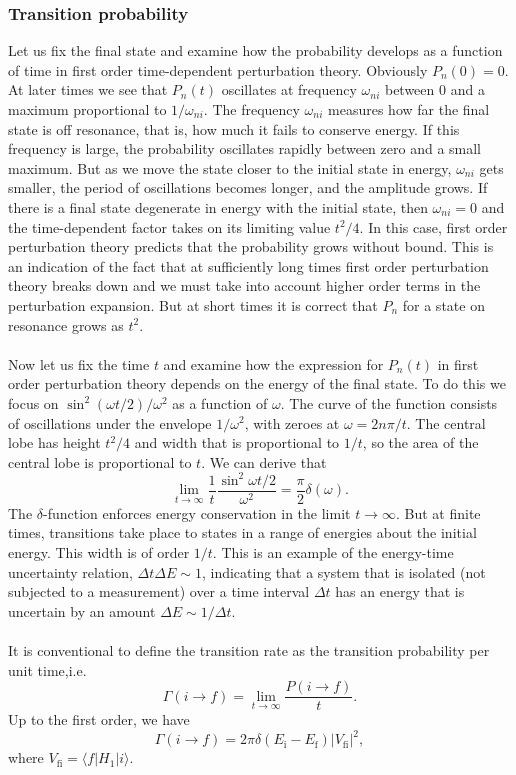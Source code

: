 \subsubsection{Transition probability}
Let us fix the final state and examine how the probability develops as a function of time in first order time-dependent perturbation theory.
Obviously $P_n(0) = 0$. At later times we see that $P_n(t)$ oscillates at frequency $\omega_{ni}$ between $0$ and a maximum proportional to ${1}/{\omega_{ni}}$.
The frequency $\omega_{ni}$ measures how far the final state is off resonance, that is, how much it fails to conserve energy. If this frequency is large, the probability oscillates rapidly between zero and a small maximum. 
But as we move the state closer to the initial state in energy, $\omega_{ni}$ gets smaller, the period of oscillations becomes longer, and the amplitude grows.
If there is a final state degenerate in energy with the initial state, then $\omega_{ni}=0$ and the time-dependent factor takes on its limiting value ${t^2}/{4}$. In this case, first order perturbation theory predicts that the probability grows without bound.
This is an indication of the fact that at sufficiently long times first order perturbation theory breaks down and we must take into account higher order terms in the perturbation expansion. But at short times it is correct that $P_n$ for a state on resonance grows as $t^2$.
\\ \\
Now let us fix the time $t$ and examine how the expression for $P_n(t)$ in first order perturbation theory depends on the energy of the final state. To do this we focus on ${\sin^2(\omega t/2)}/{\omega^2}$ as a function of $\omega$.
The curve of the function consists of oscillations under the envelope ${1}/{\omega^2}$, with zeroes at $\omega = {2n\pi}/{t}$. 
The central lobe has height ${t^2}/{4}$ and width that is proportional to ${1}/{t}$, so the area of the central lobe
is proportional to $t$.
We can derive that
\[\lim_{t \to \infty} \frac{1}{t} \frac{\sin^2\omega t/2}{\omega^2} = \frac{\pi}{2}\delta(\omega).\]
The $\delta$-function enforces energy conservation in the limit $t \to \infty$. But at finite times, transitions take place to states in a range of energies about the initial energy.
This width is of order ${1}/{t}$. This is an example of the energy-time uncertainty relation, $\Delta t \Delta E \sim 1$, indicating that a system that is isolated (not
subjected to a measurement) over a time interval $\Delta t$ has an energy that is uncertain by an amount $\Delta E \sim {1}/{\Delta t}$.
\\ \\
It is conventional to define the transition rate as the transition probability per unit time,i.e.
\[\Gamma(i \to f) = \lim_{t \to \infty}\frac{P(i \to f)}{t}.\]
Up to the first order, we have
\[\Gamma(i \to f) = 2\pi \delta(E_{\mathrm{i}} - E_{\mathrm{f}}) |V_{\mathrm{fi}}|^2,\]
where $V_{\mathrm{fi}} = \langle f | H_1 | i \rangle$.

